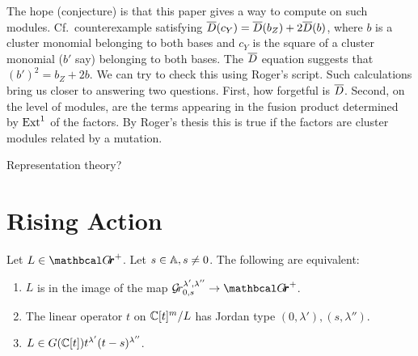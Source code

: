 \documentclass[draft]{article}
\begin{document}
The hope (conjecture) is that this paper gives a way to compute on such modules. Cf.\ counterexample satisfying $\barD(c_Y) = \barD(b_Z) + 2\barD(b)$, where $b$ is a cluster monomial belonging to both bases and $c_Y$ is the square of a cluster monomial ($b'$ say) belonging to both bases. The $\barD$ equation suggests that $(b')^2 = b_Z + 2b$. We can try to check this using Roger's script. Such calculations bring us closer to answering two questions. First, how forgetful is $\barD$. Second, on the level of modules, are the terms appearing in the fusion product determined by $\Ext^1$ of the factors. By Roger's thesis this is true if the factors are cluster modules related by a mutation. 


Representation theory? 

\section{Rising Action} %

\begin{lemma} \label{le:Grl1l2}
    Let $ L \in \Grth^+ $.  Let $ s \in \AA, s \ne 0 $.  The following are equivalent:
    \begin{enumerate}
        \item $ L $ is in the image of the map $ \Gr^{\lambda', \lambda''}_{0,s} \rightarrow \Grth^+$. 
        \item The linear operator $ t $ on $ \CC[t]^m/L$ has Jordan type $(0,\lambda'), (s,\lambda'')$.
        \item $ L \in G(\CC[t]) t^{\lambda'} (t-s)^{\lambda''}$.
    \end{enumerate}
\end{lemma}
\end{document}
